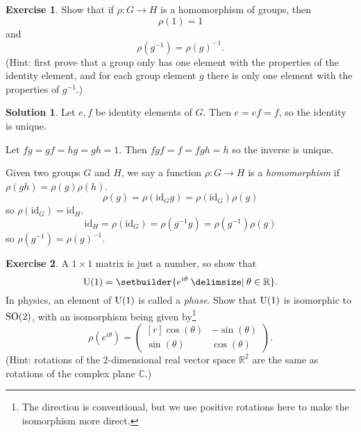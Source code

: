 \documentclass[11pt, a4paper]{report}
\theoremstyle{definition}
\newtheorem{ex}{Exercise}[part]
\newtheorem{sol}{Solution}[part]
\newcommand*{\SO}{\ensuremath\text{SO}}
\newcommand*{\U}{\ensuremath\text{U}}
\begin{document}
\begin{ex}

Show that if $\rho: G \to H$ is a homomorphism of groups, then
\[
    \rho(1) = 1
\]
and
\[
    \rho(g^{-1}) = {\rho(g)}^{-1}.
\]
(Hint: first prove that a group only has one element with the properties of the identity element, and for each group element $g$ there is only one element with the properties of $g^{-1}$.)

\end{ex}

\begin{sol}

Let $e, f$ be identity elements of $G$. Then $e = ef = f$, so the identity is unique.

Let $fg = gf = hg = gh = 1$. Then $fgf = f = fgh = h$ so the inverse is unique.

Given two groups $G$ and $H$, we say a function $\rho: G \to H$ is a \emph{homomorphism} if $\rho(gh) = \rho(g) \rho(h)$.
\[
    \rho(g) = \rho(\text{id}_G g) = \rho(\text{id}_G) \rho(g)
\]
so $\rho(\text{id}_G) = \text{id}_H$.
\[
    \text{id}_H = \rho(\text{id}_G) = \rho(g^{-1} g) = \rho(g^{-1}) \rho(g)
\]
so $\rho(g^{-1}) = {\rho(g)}^{-1}$.

\end{sol}

\begin{ex}

A $1 \times 1$ matrix is just a number, so show that
\[
    \U(1) = \setbuilder{e^{i\theta} \given \theta \in \mathbb{R}}.
\]
In physics, an element of $\U(1)$ is called a \emph{phase}.
Show that $\U(1)$ is isomorphic to $\SO(2)$, with an isomorphism being given by\footnote{The direction is conventional, but we use positive rotations here to make the isomorphism more direct.}
\[
    \rho(e^{i\theta}) =
        \begin{pmatrix*}[r]
            \cos(\theta) & -\sin(\theta) \\
            \sin(\theta) & \cos(\theta)
        \end{pmatrix*}.
\]
(Hint: rotations of the 2-dimensional real vector space $\mathbb{R}^2$ are the same as rotations of the complex plane $\mathbb{C}$.)

\end{ex}
\end{document}
